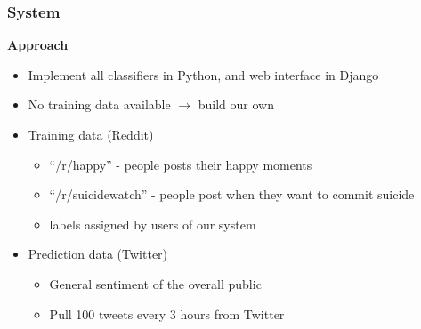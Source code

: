 \documentclass{beamer}
\begin{document}
    \begin{frame}
        \frametitle{System}
        \begin{center}
            \textbf{Approach}
        \end{center}
        \begin{itemize}
            \item{Implement all classifiers in Python, and web interface in Django}
            \item{No training data available $\rightarrow$ build our own}
            \pause
            \item{
            Training data (Reddit)
            \begin{itemize}
                \item{``/r/happy'' - people posts their happy moments}
                \item{``/r/suicidewatch'' - people post when they want to commit suicide}
                \item{labels assigned by users of our system}
            \end{itemize}
            }
            \pause
            \item{
            Prediction data (Twitter)
            \begin{itemize}
                \item{General sentiment of the overall public}
                \item{Pull 100 tweets every 3 hours from Twitter}
            \end{itemize}
            }
        \end{itemize}
    \end{frame}
    
\end{document}
